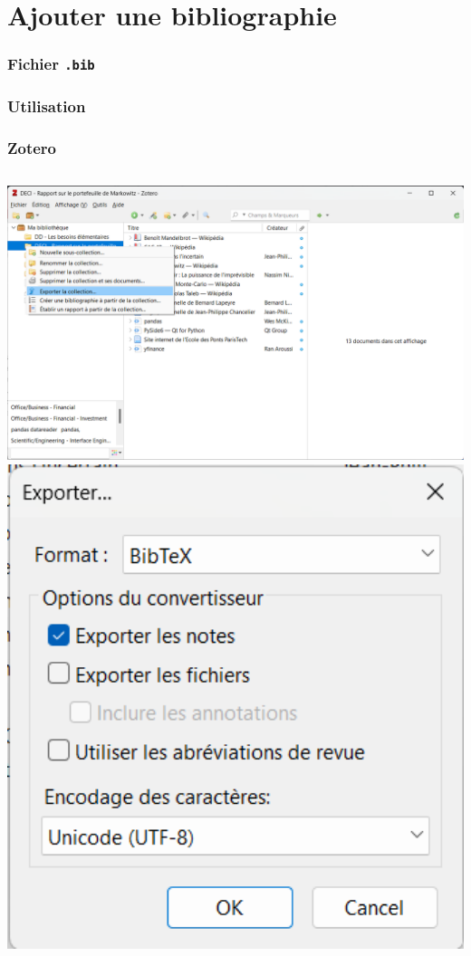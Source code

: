 \documentclass{beamer}
\begin{document}
    \section{Ajouter une bibliographie}
    \begin{frame}
        \frametitle{Fichier \texttt{.bib}}
        
    \end{frame}
    \begin{frame}
        \frametitle{Utilisation}
        
    \end{frame}
    \begin{frame}
        \frametitle{Zotero}
        \begin{columns}
            \centering
            \includegraphics[width=1\textwidth]{assets/zotero.png}
            \centering
            \includegraphics[width=1\textwidth]{assets/zotero2.png}
        \end{columns}
    \end{frame}
\end{document}
